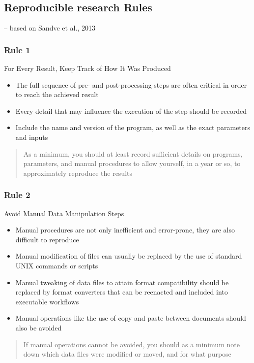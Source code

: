 \documentclass{beamer}
\begin{document}
\begin{frame}
\section{Reproducible research Rules}
\vspace{30pt}
\scriptsize  
\raggedleft -- based on Sandve et al., 2013 \citep{Sandve:2013gh}
\end{frame}
\begin{frame}
\frametitle{Rule 1}
{\sc For Every Result, Keep Track of How It Was Produced}
\begin{itemize}
    \item  The full sequence of pre- and post-processing steps are often critical in order to reach the achieved result
    \item Every detail that may influence the execution of the step should be recorded
    \item Include the name and version of the program, as well as the exact parameters and inputs
\end{itemize}
\begin{quote}As a minimum, you should at least record sufficient details on programs, parameters, and manual procedures to allow yourself, in a year or so, to approximately reproduce the results\end{quote}
\end{frame}
\begin{frame}
\frametitle{Rule 2}
{\sc Avoid Manual Data Manipulation Steps}
\begin{itemize}
    \item Manual procedures are not only inefficient and error-prone, they are also difficult to reproduce
    \item Manual modification of files can usually be replaced by the use of standard UNIX commands or scripts
    \item Manual tweaking of data files to attain format compatibility should be replaced by format converters that can be reenacted and included into executable workflows
    \item Manual operations like the use of copy and paste between documents should also be avoided
\end{itemize}
\begin{quote}
If manual operations cannot be avoided, you should as a minimum note down which data files were modified or moved, and for what purpose
\end{quote}

\end{frame}
\end{document}

